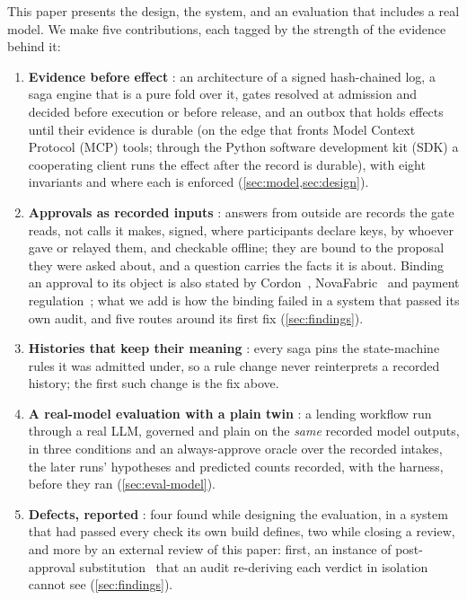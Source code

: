 This paper presents the design, the system, and an evaluation that includes a
real model. We make five contributions, each tagged by the strength of the
evidence behind it:
\begin{enumerate}
\item \textbf{Evidence before effect} : an architecture
  of a signed hash-chained log, a saga engine that is a pure fold over it, gates
  resolved at admission and decided before execution or before release, and an
  outbox that holds effects until their evidence is durable (on the edge that
  fronts Model Context Protocol (MCP) tools; through the Python software
  development kit (SDK) a cooperating client runs the effect after the record is
  durable), with eight invariants and where each is enforced
  (\cref{sec:model,sec:design}).
\item \textbf{Approvals as recorded inputs} :
  answers from outside are records the gate reads, not calls it makes, signed,
  where participants declare keys, by whoever gave or relayed them, and
  checkable offline; they are bound to the proposal they
  were asked about, and a question carries the facts it is about. Binding an
  approval to its object is also stated by Cordon~\cite{cordon},
  NovaFabric~\cite{novafabric} and payment regulation~\cite{psd2rts}; what we
  add is how the binding failed in a system that passed its own audit, and five
  routes around its first fix (\cref{sec:findings}).
\item \textbf{Histories that keep their meaning} : every
  saga pins the state-machine rules it was admitted under, so a rule change never
  reinterprets a recorded history; the first such change is the fix above.
\item \textbf{A real-model evaluation with a plain twin} : a lending
  workflow run through a real LLM, governed and plain on the \emph{same} recorded
  model outputs, in three conditions and an always-approve oracle over the
  recorded intakes, the later runs' hypotheses and predicted counts recorded, with
  the harness, before they ran (\cref{sec:eval-model}).
\item \textbf{Defects, reported} : four found while
  designing the evaluation, in a system that had passed every check its own build
  defines, two while closing a review, and more by an external review of this
  paper: first, an instance of post-approval substitution~\cite{loopjacking} that an audit
  re-deriving each verdict in isolation cannot see (\cref{sec:findings}).
\end{enumerate}

